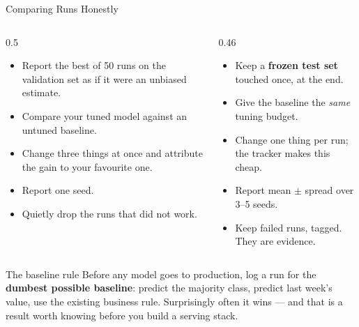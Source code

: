 \begin{frame}{Comparing Runs Honestly}

    \begin{columns}[T]
        \begin{column}{0.5\textwidth}
            \begin{tcolorbox}[colback=red!5, colframe=red!50, title=\scriptsize Dishonest but common]
                \scriptsize
                \begin{itemize}
                    \item Report the best of 50 runs on the validation set as if it were an unbiased estimate.
                    \item Compare your tuned model against an untuned baseline.
                    \item Change three things at once and attribute the gain to your favourite one.
                    \item Report one seed.
                    \item Quietly drop the runs that did not work.
                \end{itemize}
            \end{tcolorbox}
        \end{column}
        \begin{column}{0.46\textwidth}
            \begin{tcolorbox}[colback=green!5, colframe=green!50!black, title=\scriptsize What to do instead]
                \scriptsize
                \begin{itemize}
                    \item Keep a \textbf{frozen test set} touched once, at the end.
                    \item Give the baseline the \emph{same} tuning budget.
                    \item Change one thing per run; the tracker makes this cheap.
                    \item Report mean $\pm$ spread over 3--5 seeds.
                    \item Keep failed runs, tagged. They are evidence.
                \end{itemize}
            \end{tcolorbox}
        \end{column}
    \end{columns}

    \vspace{0.21em}
    \begin{alertblock}{The baseline rule}
        Before any model goes to production, log a run for the \textbf{dumbest possible baseline}: predict
        the majority class, predict last week's value, use the existing business rule. Surprisingly often it
        wins --- and that is a result worth knowing before you build a serving stack.
    \end{alertblock}

\end{frame}
